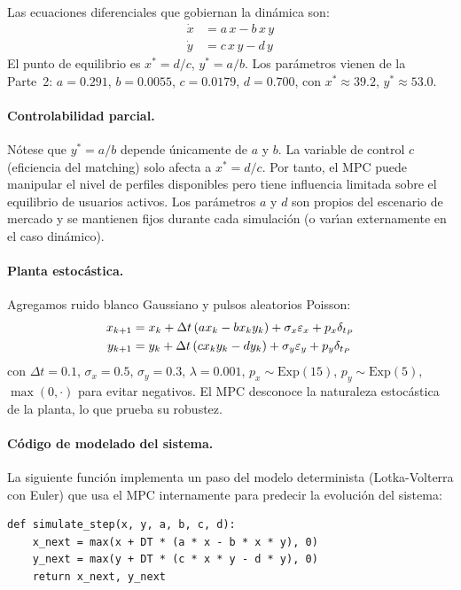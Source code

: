 \documentclass[twocolumn,10pt]{article}
\begin{document}
Las ecuaciones diferenciales que gobiernan la din\'amica son:
\begin{align}
  \dot{x} &= a\,x - b\,x\,y \label{eq:prey}\\
  \dot{y} &= c\,x\,y - d\,y \label{eq:pred}
\end{align}
El punto de equilibrio es $x^*=d/c$, $y^*=a/b$. Los par\'ametros
vienen de la Parte~2: $a=0.291$, $b=0.0055$, $c=0.0179$, $d=0.700$,
con $x^*\approx39.2$, $y^*\approx53.0$.

\paragraph{Controlabilidad parcial.}
N\'otese que $y^* = a/b$ depende \'unicamente de $a$ y $b$. La
variable de control $c$ (eficiencia del matching) solo afecta a
$x^* = d/c$. Por tanto, el MPC puede manipular el nivel de
perfiles disponibles pero tiene influencia limitada sobre el
equilibrio de usuarios activos. Los par\'ametros $a$ y $d$ son
propios del escenario de mercado y se mantienen fijos durante
cada simulaci\'on (o var\'\i an externamente en el caso din\'amico).

\paragraph{Planta estoc\'astica.} Agregamos ruido blanco Gaussiano
y pulsos aleatorios Poisson:
\begin{align}
  x_{k+1} &= x_k + \Delta t\,(a x_k - b x_k y_k)
            + \sigma_x\varepsilon_x + p_x\delta_{t_P} \notag\\
  y_{k+1} &= y_k + \Delta t\,(c x_k y_k - d y_k)
            + \sigma_y\varepsilon_y + p_y\delta_{t_P} \notag
\end{align}
con $\Delta t=0.1$, $\sigma_x=0.5$, $\sigma_y=0.3$,
$\lambda=0.001$, $p_x\sim\text{Exp}(15)$, $p_y\sim\text{Exp}(5)$,
$\max(0,\cdot)$ para evitar negativos. El MPC desconoce la
naturaleza estoc\'astica de la planta, lo que prueba su robustez.

\paragraph{C\'odigo de modelado del sistema.}
La siguiente funci\'on implementa un paso del modelo determinista
(Lotka-Volterra con Euler) que usa el MPC internamente para
predecir la evoluci\'on del sistema:
\begin{lstlisting}
def simulate_step(x, y, a, b, c, d):
    x_next = max(x + DT * (a * x - b * x * y), 0)
    y_next = max(y + DT * (c * x * y - d * y), 0)
    return x_next, y_next
\end{lstlisting}
\end{document}
